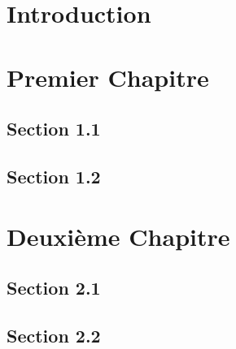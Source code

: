 \documentclass{report}
\begin{document}
\tableofcontents

\chapter{Introduction}

\chapter{Premier Chapitre}
\section{Section 1.1}
\section{Section 1.2}

\chapter{Deuxième Chapitre}
\section{Section 2.1}
\section{Section 2.2}
\end{document}
